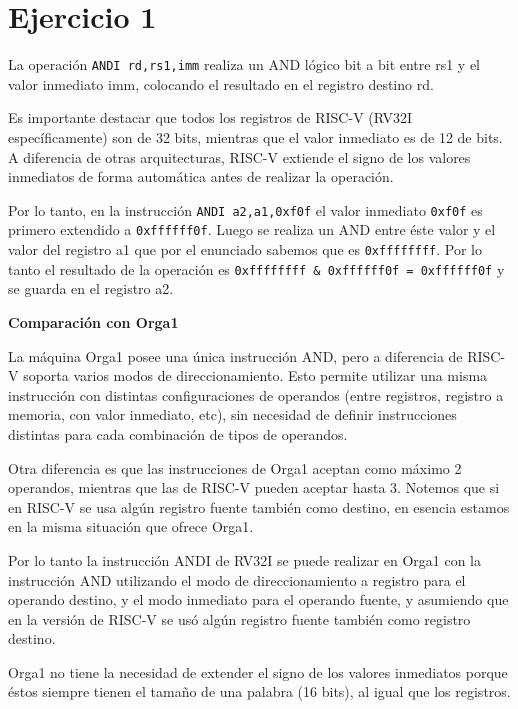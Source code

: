 \section{Ejercicio 1}

La operación \lstinline{ANDI rd,rs1,imm} realiza un AND lógico bit a bit entre rs1 y el valor inmediato imm, colocando el resultado en el registro destino rd.

Es importante destacar que todos los registros de RISC-V (RV32I específicamente) son de 32 bits, mientras que el valor inmediato es de 12 de bits. A diferencia de otras arquitecturas, RISC-V extiende el signo de los valores inmediatos de forma automática antes de realizar la operación.

Por lo tanto, en la instrucción \lstinline{ANDI a2,a1,0xf0f} el valor inmediato \lstinline{0xf0f} es primero extendido a \lstinline{0xffffff0f}. Luego se realiza un AND entre éste valor y el valor del registro a1 que por el enunciado sabemos que es \lstinline{0xffffffff}. Por lo tanto el resultado de la operación es \lstinline{0xffffffff & 0xffffff0f = 0xffffff0f} y se guarda en el registro a2.

\textbf{Comparación con Orga1}

La máquina Orga1 posee una única instrucción AND, pero a diferencia de RISC-V soporta varios modos de direccionamiento. Esto permite utilizar una misma instrucción con distintas configuraciones de operandos (entre registros, registro a memoria, con valor inmediato, etc), sin necesidad de definir instrucciones distintas para cada combinación de tipos de operandos.

Otra diferencia es que las instrucciones de Orga1 aceptan como máximo 2 operandos, mientras que las de RISC-V pueden aceptar hasta 3. Notemos que si en RISC-V se usa algún registro fuente también como destino, en esencia estamos en la misma situación que ofrece Orga1.

Por lo tanto la instrucción ANDI de RV32I se puede realizar en Orga1 con la instrucción AND utilizando el modo de direccionamiento a registro para el operando destino, y el modo inmediato para el operando fuente, y asumiendo que en la versión de RISC-V se usó algún registro fuente también como registro destino.

Orga1 no tiene la necesidad de extender el signo de los valores inmediatos porque éstos siempre tienen el tamaño de una palabra (16 bits), al igual que los registros.
